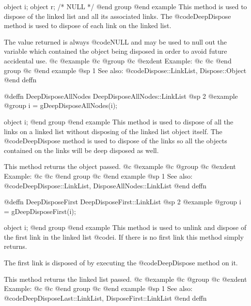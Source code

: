 object  i;
object  r;     /*  NULL  */
@end group
@end example
This method is used to dispose of the linked list and all its associated
links.  The @code{DeepDispose} method is used to dispose of each link
on the linked list.

The value returned is always @code{NULL} and may be used to null out
the variable which contained the object being disposed in order to
avoid future accidental use.
@c @example
@c @group
@c @exdent Example:
@c 
@c @end group
@c @end example
@sp 1
See also:  @code{Dispose::LinkList, Dispose::Object}
@end deffn









@deffn {DeepDisposeAllNodes} DeepDisposeAllNodes::LinkList
@sp 2
@example
@group
i = gDeepDisposeAllNodes(i);

object  i;
@end group
@end example
This method is used to dispose of all the links on a linked list without
disposing of the linked list object itself.  The @code{DeepDispose}
method is used to dispose of the links so all the objects contained on
the links will be deep disposed as well.

This method returns the object passed.
@c @example
@c @group
@c @exdent Example:
@c 
@c @end group
@c @end example
@sp 1
See also:  @code{DeepDispose::LinkList, DisposeAllNodes::LinkList}
@end deffn
















@deffn {DeepDisposeFirst} DeepDisposeFirst::LinkList
@sp 2
@example
@group
i = gDeepDisposeFirst(i);

object  i;
@end group
@end example
This method is used to unlink and dispose of the first link in the
linked list @code{i}.  If there is no first link this method simply
returns.

The first link is disposed of by executing the @code{DeepDispose}
method on it.

This method returns the linked list passed.
@c @example
@c @group
@c @exdent Example:
@c 
@c @end group
@c @end example
@sp 1
See also:  @code{DeepDisposeLast::LinkList, DisposeFirst::LinkList}
@end deffn











